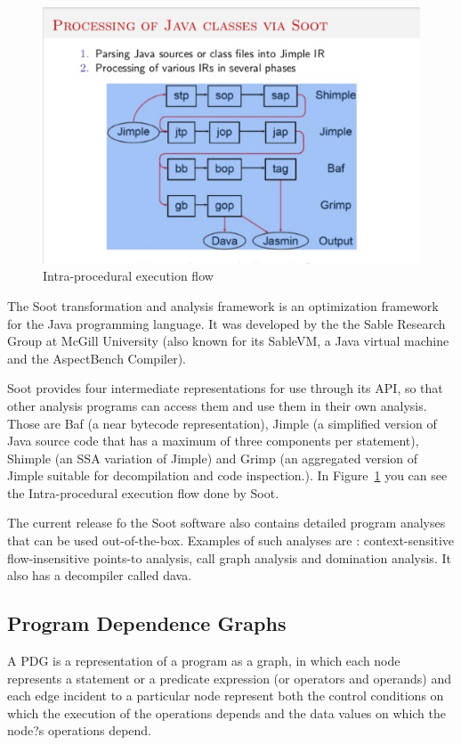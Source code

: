 \documentclass[authoryear,preprint]{sigplanconf}
\begin{document}
\begin{figure}[ht]
	\centering
	\includegraphics[width=.9\linewidth]{figures/soot_example}
         \caption[Intra-procedural execution flow]{\label{fig1}Intra-procedural execution flow}
\end{figure}

The Soot transformation and analysis framework is an optimization framework for the Java programming language. It was developed by the the Sable Research Group at McGill University (also known for its SableVM, a Java virtual machine and the AspectBench Compiler). 


Soot provides four intermediate representations for use through its API, so that other analysis programs can access them and use them in their own analysis. Those are Baf (a near bytecode representation), Jimple (a simplified version of Java source code that has a maximum of three components per statement), Shimple (an SSA variation of Jimple) and Grimp (an aggregated version of Jimple suitable for decompilation and code inspection.). In Figure~\ref{fig1} you can see the Intra-procedural execution flow done by Soot.

The current release fo the Soot software also contains detailed program analyses that can be used out-of-the-box. Examples of such analyses are : context-sensitive flow-insensitive points-to analysis, call graph analysis and domination analysis. It also has a decompiler called dava. 

\subsection{Program Dependence Graphs}
A PDG is a representation of a program as a graph, in which each node represents a statement or a predicate expression (or operators and operands) and each edge incident to a particular node represent both the control conditions on which the execution of the operations depends and the data values on which the node?s operations depend.
\end{document}
